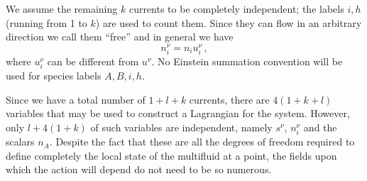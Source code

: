 \documentclass[usenatbib]{mnras}
\begin{document}
We assume the remaining $k$ currents to be completely independent; the labels $i,h$ (running from 1 to $k$) are used to count them. 
Since they can flow in an arbitrary direction we call them ``free'' and in general we have 
%
\begin{equation}
n_i^\nu = n_i u_i^\nu \, ,
\end{equation}
%
where $u_i^\nu$ can be different from $u^\nu$. No Einstein summation convention will be used for species labels $A,B, i, h$.

Since we have a total number of $1+l+k$ currents, there are  $4(1+k+l)$ variables that may be used to construct a Lagrangian for the system. However, only $l+4(1+k)$ of such variables are independent, namely $s^\nu$, $n_i^\nu$ and the scalars $n_A$. Despite the fact that these are all the degrees of freedom required to define completely the local state of the multifluid at a point, the fields upon which the action will depend do not need to be so numerous. 
\end{document}
